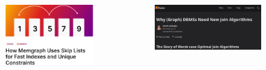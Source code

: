 \documentclass[
	aspectratio=169,
	compress,
]{beamer}
\begin{document}
\begin{frame}
\begin{columns}[T]
\begin{column}{0.3\textwidth}
\begin{figure}
\begin{center}
                \end{center}
            \end{figure}
            \begin{figure}
                \caption{\cite{MemgraphSkipList}}
                \begin{center}
                    \includegraphics[width=\textwidth]{./figures/memgraphSkip.png}
                \end{center}
            \end{figure}
        \end{column}
        \pause
		\begin{column}{0.3\textwidth}
            \begin{figure}
                \caption{\cite{kuzudbWCOJ}}
                \begin{center}
                    \includegraphics[height=0.2\textheight]{./figures/kuzuWCOJ.png}
                \end{center}
            \end{figure}

\end{column}
\end{columns}
\end{frame}
\end{document}
